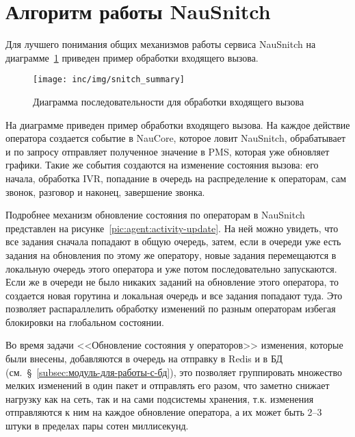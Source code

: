 \section{Алгоритм работы NauSnitch}

Для лучшего понимания общих механизмов работы сервиса NauSnitch
на диаграмме~\ref{pic:uml-seq-summary} приведен пример обработки входящего вызова.

\begin{figure}[ht]
    \centering
    \texttt{[image: inc/img/snitch\_summary]}
    \caption{Диаграмма последовательности для обработки входящего вызова}
    \label{pic:uml-seq-summary}
\end{figure}

На диаграмме приведен пример обработки входящего вызова.
На каждое действие оператора создается событие в NauCore, которое ловит NauSnitch,
обрабатывает и по запросу отправляет полученное значение в PMS,
которая уже обновляет графики.
Такие же события создаются на изменение состояния вызова: его начала, обработка IVR,
попадание в очередь на распределение к операторам, сам звонок, разговор и наконец, завершение звонка.

Подробнее механизм обновление состояния по операторам в NauSnitch представлен на рисунке~\ref{pic:agent:activity-update}.
На ней можно увидеть, что все задания сначала попадают в общую очередь,
затем, если в очереди уже есть задания на обновления по этому же оператору,
новые задания перемещаются в локальную очередь этого оператора и уже потом последовательно запускаются.
Если же в очереди не было никаких заданий на обновление этого оператора,
то создается новая горутина и локальная очередь и все задания попадают туда.
Это позволяет распараллелить обработку изменений по разным операторам
избегая блокировки на глобальном состоянии.

Во время задачи <<Обновление состояния у операторов>>
изменения, которые были внесены, добавляются в очередь на отправку в Redis и в БД (см.~\S~\ref{subsec:модуль-для-работы-с-бд}),
это позволяет группировать множество мелких изменений в один пакет и отправлять его разом,
что заметно снижает нагрузку как на сеть, так и на сами подсистемы хранения,
т.к. изменения отправляются к ним на каждое обновление оператора, а их может быть 2--3 штуки в пределах пары сотен миллисекунд.

